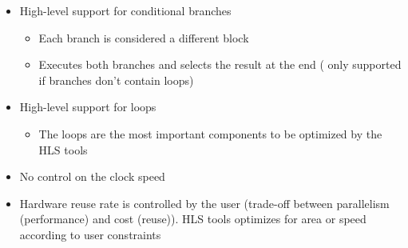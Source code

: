 \documentclass{cup-pan}
\begin{document}
\begin{itemize}
\begin{itemize}
\begin{itemize}
            \end{itemize}
        \item  High-level support for conditional branches
            \begin{itemize}
                \item  Each branch is considered a different block
                \item  Executes both branches and selects the result at the end ( only supported if branches don’t contain loops)
            \end{itemize}            
        \item  High-level support for loops
            \begin{itemize}
                \item  The loops are the most important components to be optimized by the HLS tools
            \end{itemize}
        \item  No control on the clock speed
        \item  Hardware reuse rate is controlled by the user (trade-off between parallelism (performance) and cost (reuse)). HLS tools optimizes for area or speed according to user constraints
    \end{itemize}
\end{itemize}
\end{document}
